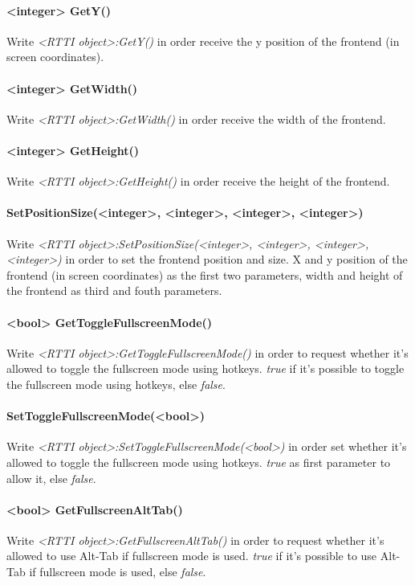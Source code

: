\paragraph{<integer> GetY()}
Write \emph{<RTTI object>:GetY()} in order receive the y position of the frontend (in screen coordinates).

\paragraph{<integer> GetWidth()}
Write \emph{<RTTI object>:GetWidth()} in order receive the width of the frontend.

\paragraph{<integer> GetHeight()}
Write \emph{<RTTI object>:GetHeight()} in order receive the height of the frontend.

\paragraph{SetPositionSize(<integer>, <integer>, <integer>, <integer>)}
Write \emph{<RTTI object>:SetPositionSize(<integer>, <integer>, <integer>, <integer>)} in order to set the frontend position and size. X and y position of the frontend (in screen coordinates) as the first two parameters, width and height of the frontend as third and fouth parameters.

\paragraph{<bool> GetToggleFullscreenMode()}
Write \emph{<RTTI object>:GetToggleFullscreenMode()} in order to request whether it's allowed to toggle the fullscreen mode using hotkeys. \emph{true} if it's possible to toggle the fullscreen mode using hotkeys, else \emph{false}.

\paragraph{SetToggleFullscreenMode(<bool>)}
Write \emph{<RTTI object>:SetToggleFullscreenMode(<bool>)} in order set whether it's allowed to toggle the fullscreen mode using hotkeys. \emph{true} as first parameter to allow it, else \emph{false}.

\paragraph{<bool> GetFullscreenAltTab()}
Write \emph{<RTTI object>:GetFullscreenAltTab()} in order to request whether it's allowed to use Alt-Tab if fullscreen mode is used. \emph{true} if it's possible to use Alt-Tab if fullscreen mode is used, else \emph{false}.

